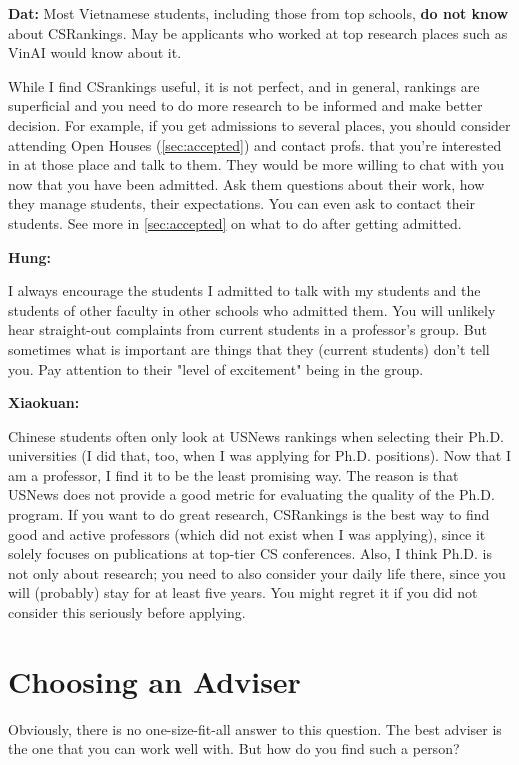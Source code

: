\documentclass[oneside,11pt]{book}
\newenvironment{commentbox}[1][]{
  \small
  \begin{mybox}
    {\small \textbf{#1}}
  }{
  \end{mybox}
}
\begin{document}
\begin{commentbox}[Dat:] Most Vietnamese students, including those from top schools, \textbf{do not know} about CSRankings.  May be applicants who worked at top research places such as VinAI would know about it.
\end{commentbox}

While I find CSrankings useful, it is not perfect, and in general, rankings are superficial and you need to do more research to be informed and make better decision. For example, if you get admissions to several places, you should consider attending Open Houses (\autoref{sec:accepted}) and contact profs. that you're interested in at those place and talk to them. They would be more willing to chat with you now that you have been admitted.  Ask them questions about their work, how they manage students, their expectations. You can even ask to contact their students. See more in \autoref{sec:accepted} on what to do after getting admitted.


\begin{commentbox}[Hung:]
  I always encourage the students I admitted to talk with my students and the students of other faculty in other schools who admitted them. You will unlikely hear straight-out complaints from current students in a professor’s group. But sometimes what is important are things that they (current students) don’t tell you. Pay attention to their "level of excitement" being in the group.
\end{commentbox}

\begin{commentbox}[Xiaokuan:]
  Chinese students often only look at USNews rankings when selecting their Ph.D. universities (I did that, too, when I was applying for Ph.D. positions).
  Now that I am a professor, I find it to be the least promising way.
  The reason is that USNews does not provide a good metric for evaluating the quality of the Ph.D. program.
  If you want to do great research, CSRankings is the best way to find good and active professors (which did not exist when I was applying),
  since it solely focuses on publications at top-tier CS conferences.
  Also,
  I think Ph.D. is not only about research;
  you need to also consider your daily life there, since you will (probably) stay for at least five years.
  You might regret it if you did not consider this seriously before applying.
\end{commentbox}

\section{Choosing an Adviser}
Obviously, there is no one-size-fit-all answer to this question. The best adviser is the one that you can work well with.  But how do you find such a person?
\end{document}
